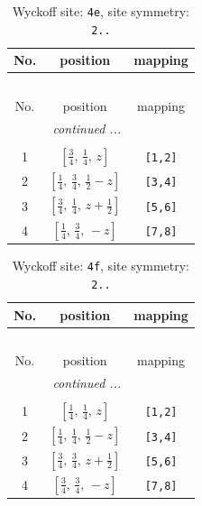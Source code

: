 \documentclass[fleqn,8pt]{jsarticle}
\begin{document}
\renewcommand{\arraystretch}{1.2}
\begin{longtable}{ccc}
\caption{Wyckoff site: {\tt 4e}, site symmetry: {\tt 2..}}
 \\
 \hline \hline
No. & position & mapping \\ \hline \endfirsthead

\multicolumn{2}{l}{\tablename\ \thetable{}} \\
 \hline \hline
No. & position & mapping \\ \hline \endhead

 \hline \hline
\multicolumn{2}{r}{\footnotesize\it continued ...} \\ \endfoot

 \hline \hline
\multicolumn{2}{r}{} \\ \endlastfoot

1 & $\left[ \frac{3}{4},\, \frac{1}{4},\, z \right]$ & {\tt [1,2]} \\ \hline
2 & $\left[ \frac{1}{4},\, \frac{3}{4},\, \frac{1}{2} - z \right]$ & {\tt [3,4]} \\ \hline
3 & $\left[ \frac{3}{4},\, \frac{1}{4},\, z + \frac{1}{2} \right]$ & {\tt [5,6]} \\ \hline
4 & $\left[ \frac{1}{4},\, \frac{3}{4},\, - z \right]$ & {\tt [7,8]} \\
\end{longtable}
\renewcommand{\arraystretch}{1.2}
\begin{longtable}{ccc}
\caption{Wyckoff site: {\tt 4f}, site symmetry: {\tt 2..}}
 \\
 \hline \hline
No. & position & mapping \\ \hline \endfirsthead

\multicolumn{2}{l}{\tablename\ \thetable{}} \\
 \hline \hline
No. & position & mapping \\ \hline \endhead

 \hline \hline
\multicolumn{2}{r}{\footnotesize\it continued ...} \\ \endfoot

 \hline \hline
\multicolumn{2}{r}{} \\ \endlastfoot

1 & $\left[ \frac{1}{4},\, \frac{1}{4},\, z \right]$ & {\tt [1,2]} \\ \hline
2 & $\left[ \frac{1}{4},\, \frac{1}{4},\, \frac{1}{2} - z \right]$ & {\tt [3,4]} \\ \hline
3 & $\left[ \frac{3}{4},\, \frac{3}{4},\, z + \frac{1}{2} \right]$ & {\tt [5,6]} \\ \hline
4 & $\left[ \frac{3}{4},\, \frac{3}{4},\, - z \right]$ & {\tt [7,8]} \\
\end{longtable}
\end{document}
